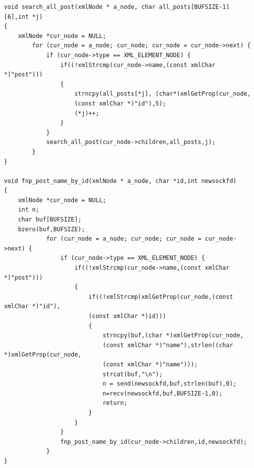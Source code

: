 \documentclass[10pt,a4paper]{report}
\begin{document}
\begin{verbatim}
void search_all_post(xmlNode * a_node, char all_posts[BUFSIZE-1][6],int *j)
{
	xmlNode *cur_node = NULL;
	    for (cur_node = a_node; cur_node; cur_node = cur_node->next) {
	        if (cur_node->type == XML_ELEMENT_NODE) {
	            if((!xmlStrcmp(cur_node->name,(const xmlChar *)"post")))
	            {
	            	strncpy(all_posts[*j], (char*)xmlGetProp(cur_node,
	            	(const xmlChar *)"id"),5);
	            	(*j)++;
				}
	        }
	        search_all_post(cur_node->children,all_posts,j);
	    }
}

void fnp_post_name_by_id(xmlNode * a_node, char *id,int newsockfd)
{
	xmlNode *cur_node = NULL;
	int n;
	char buf[BUFSIZE];
	bzero(buf,BUFSIZE);
			for (cur_node = a_node; cur_node; cur_node = cur_node->next) {
				if (cur_node->type == XML_ELEMENT_NODE) {
					if((!xmlStrcmp(cur_node->name,(const xmlChar *)"post")))
					{
						if((!xmlStrcmp(xmlGetProp(cur_node,(const xmlChar *)"id"),
						(const xmlChar *)id)))
						{
							strncpy(buf,(char *)xmlGetProp(cur_node,
							(const xmlChar *)"name"),strlen((char *)xmlGetProp(cur_node,
							(const xmlChar *)"name")));
							strcat(buf,"\n");
							n = send(newsockfd,buf,strlen(buf),0);
							n=recv(newsockfd,buf,BUFSIZE-1,0);
							return;
						}
					}
			    }
				fnp_post_name_by_id(cur_node->children,id,newsockfd);
			}
}


\end{verbatim}
\end{document}
